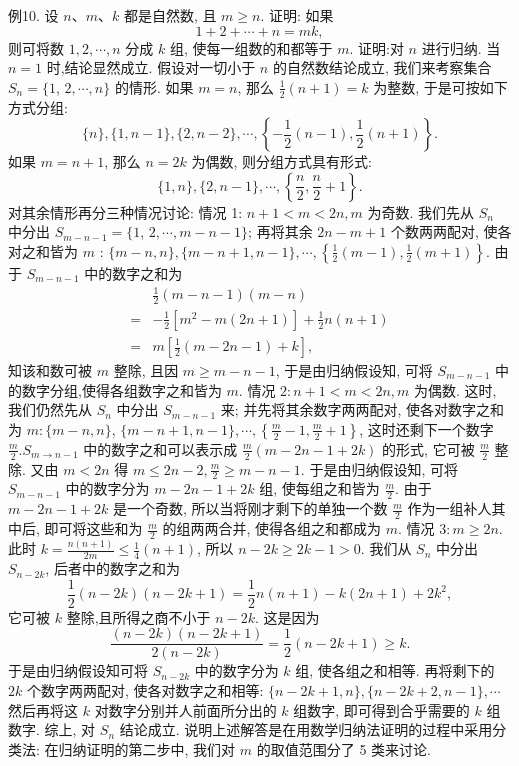 例10. 设 $n 、 m 、 k$ 都是自然数, 且 $m \geqslant n$. 证明: 如果
$$
1+2+\cdots+n=m k,
$$
则可将数 $1,2, \cdots, n$ 分成 $k$ 组, 使每一组数的和都等于 $m$.
证明:对 $n$ 进行归纳.
当 $n=1$ 时,结论显然成立.
假设对一切小于 $n$ 的自然数结论成立, 我们来考察集合 $S_n=\{1$, $2, \cdots, n\}$ 的情形.
如果 $m=n$, 那么 $\frac{1}{2}(n+1)=k$ 为整数, 于是可按如下方式分组:
$$
\{n\},\{1, n-1\},\{2, n-2\}, \cdots,\left\{-\frac{1}{2}(n-1), \frac{1}{2}(n+1)\right\} .
$$
如果 $m=n+1$, 那么 $n=2 k$ 为偶数, 则分组方式具有形式:
$$
\{1, n\},\{2, n-1\}, \cdots,\left\{\frac{n}{2}, \frac{n}{2}+1\right\} .
$$
对其余情形再分三种情况讨论:
情况 1: $n+1<m<2 n, m$ 为奇数.
我们先从 $S_n$ 中分出 $S_{m-n-1}=\{1$, $2, \cdots, m-n-1\}$; 再将其余 $2 n-m+1$ 个数两两配对, 使各对之和皆为 $m$ : $\{m-n, n\},\{m-n+1, n-1\}, \cdots,\left\{\frac{1}{2}(m-1), \frac{1}{2}(m+1)\right\}$. 由于 $S_{m-n-1}$ 中的数字之和为
$$
\begin{aligned}
& \frac{1}{2}(m-n-1)(m-n) \\
= & -\frac{1}{2}\left[m^2-m(2 n+1)\right]+\frac{1}{2} n(n+1) \\
= & m\left[\frac{1}{2}(m-2 n-1)+k\right],
\end{aligned}
$$
知该和数可被 $m$ 整除, 且因 $m \geqslant m-n-1$, 于是由归纳假设知, 可将 $S_{m-n-1}$ 中的数字分组,使得各组数字之和皆为 $m$.
情况 $2: n+1<m<2 n, m$ 为偶数.
这时, 我们仍然先从 $S_n$ 中分出 $S_{m-n-1}$
来; 并先将其余数字两两配对, 使各对数字之和为 $m:\{m-n, n\}$, $\{m-n+1, n-1\}, \cdots,\left\{\frac{m}{2}-1, \frac{m}{2}+1\right\}$, 这时还剩下一个数字 $\frac{m}{2} . S_{m \rightarrow n-1}$ 中的数字之和可以表示成 $\frac{m}{2}(m-2 n-1+2 k)$ 的形式, 它可被 $\frac{m}{2}$ 整除.
又由 $m<2 n$ 得 $m \leqslant 2 n-2, \frac{m}{2} \geqslant m-n-1$. 于是由归纳假设知, 可将 $S_{m-n-1}$ 中的数字分为 $m-2 n-1+2 k$ 组, 使每组之和皆为 $\frac{m}{2}$. 由于 $m-2 n-1+2 k$ 是一个奇数, 所以当将刚才剩下的单独一个数 $\frac{m}{2}$ 作为一组补人其中后, 即可将这些和为 $\frac{m}{2}$ 的组两两合并, 使得各组之和都成为 $m$.
情况 $3: m \geqslant 2 n$. 此时 $k=\frac{n(n+1)}{2 m} \leqslant \frac{1}{4}(n+1)$, 所以 $n-2 k \geqslant 2 k- 1>0$. 我们从 $S_n$ 中分出 $S_{n-2 k}$, 后者中的数字之和为
$$
\frac{1}{2}(n-2 k)(n-2 k+1)=\frac{1}{2} n(n+1)-k(2 n+1)+2 k^2,
$$
它可被 $k$ 整除,且所得之商不小于 $n-2 k$. 这是因为
$$
\frac{(n-2 k)(n-2 k+1)}{2(n-2 k)}=\frac{1}{2}(n-2 k+1) \geqslant k .
$$
于是由归纳假设知可将 $S_{n-2 k}$ 中的数字分为 $k$ 组, 使各组之和相等.
再将剩下的 $2 k$ 个数字两两配对, 使各对数字之和相等: $\{n-2 k+1, n\},\{n- 2 k+2, n-1\}, \cdots$ 然后再将这 $k$ 对数字分别并人前面所分出的 $k$ 组数字, 即可得到合乎需要的 $k$ 组数字.
综上, 对 $S_n$ 结论成立.
说明上述解答是在用数学归纳法证明的过程中采用分类法: 在归纳证明的第二步中, 我们对 $m$ 的取值范围分了 5 类来讨论.


